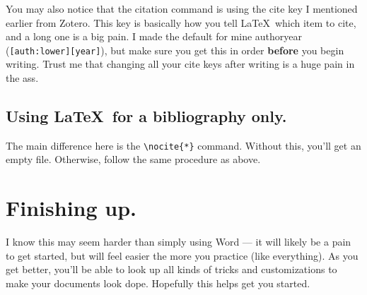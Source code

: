 \documentclass[11pt]{article}
\begin{document}
You may also notice that the citation command is using the cite key I mentioned earlier from Zotero. This key is basically how you tell \LaTeX\ which item to cite, and a long one is a big pain. I made the default for mine authoryear (\verb|[auth:lower][year]|), but make sure you get this in order \textbf{before} you begin writing. Trust me that changing all your cite keys after writing is a huge pain in the ass.

\subsection{Using \LaTeX\ for a bibliography only.}

The main difference here is the \verb|\nocite{*}| command. Without this, you'll get an empty file. Otherwise, follow the same procedure as above.

\section{Finishing up.}

I know this may seem harder than simply using Word --- it will likely be a pain to get started, but will feel easier the more you practice (like everything). As you get better, you'll be able to look up all kinds of tricks and customizations to make your documents look dope. Hopefully this helps get you started.
\end{document}
